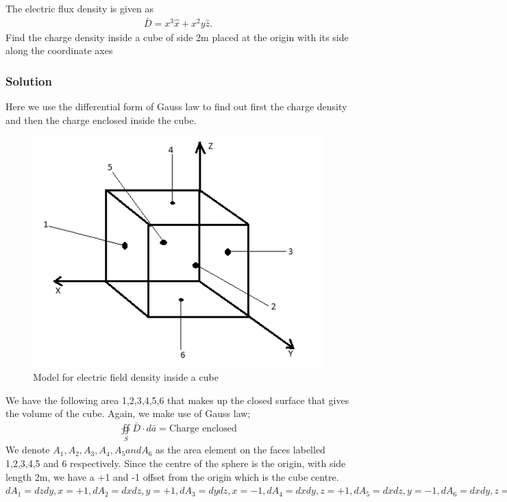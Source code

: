 \begin{exmp}
The electric flux density is given as
\begin{align*}
\bar{D}=x^{3}\hat{x} + x^{2}y\hat{z}.
\end{align*}
Find the charge density inside a cube of side 2m placed at the origin with its side along the coordinate axes

\subsubsection*{Solution}
 
Here we use the differential form of Gauss law to find out first the charge density and then the charge enclosed inside the cube.\\
\begin{figure}[h]
	\centering
	\includegraphics[width=0.7\linewidth]{graphics/fig150}
	\caption{Model for electric field density inside a cube}
\end{figure}

We have the following area 1,2,3,4,5,6 that makes up the closed surface that gives the volume of the cube. Again, we make use of Gauss law;
\begin{align*}
	\oiint\limits_S\bar{D}\cdot d\bar{a} = \text{Charge enclosed}
\end{align*}
We denote $A_1,A_2,A_3,A_4,A_5 and A_6$ as the area element on the faces labelled 1,2,3,4,5 and 6 respectively. Since the centre of the sphere is the origin, with side length 2m, we have a +1 and -1 offset from the origin which is the cube centre.\\

	$dA_1 = dzdy, x= +1, dA_2 = dxdz, y= +1, dA_3 = dydz, x= -1, dA_4 = dxdy, z= +1, dA_5 = dxdz, y= -1, dA_6 = dxdy, z= -1 $\\
	

\end{exmp}
